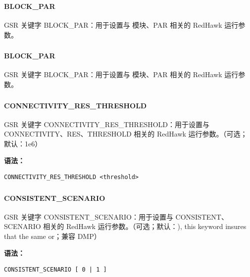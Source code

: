\subsubsection{}
\paragraph*{BLOCK_PAR}

GSR 关键字 BLOCK_PAR：用于设置与 模块、PAR 相关的 RedHawk 运行参数。

\subsubsection{}
\paragraph*{BLOCK_PAR}

GSR 关键字 BLOCK_PAR：用于设置与 模块、PAR 相关的 RedHawk 运行参数。

\subsubsection{}
\paragraph*{CONNECTIVITY_RES_THRESHOLD}

GSR 关键字 CONNECTIVITY_RES_THRESHOLD：用于设置与 CONNECTIVITY、RES、THRESHOLD 相关的 RedHawk 运行参数。（可选；默认：1e6）

\textbf{语法：}
\begin{lstlisting}
CONNECTIVITY_RES_THRESHOLD <threshold>
\end{lstlisting}

\subsubsection{}
\paragraph*{CONSISTENT_SCENARIO}

GSR 关键字 CONSISTENT_SCENARIO：用于设置与 CONSISTENT、SCENARIO 相关的 RedHawk 运行参数。（可选；默认：), this keyword insures that the same or；兼容 DMP）

\textbf{语法：}
\begin{lstlisting}
CONSISTENT_SCENARIO [ 0 | 1 ]
\end{lstlisting}

